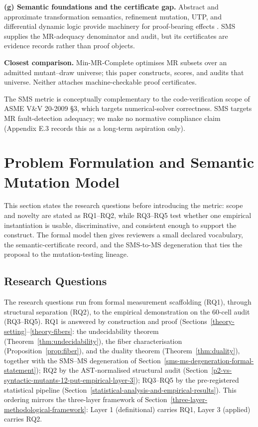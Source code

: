 \documentclass[review,12pt,authoryear]{elsarticle}
\begin{document}
\textbf{(g) Semantic foundations and the certificate gap.} Abstract and
approximate transformation semantics, refinement mutation, UTP, and
differential dynamic logic provide machinery for proof-bearing effects
\citep{46aba24d3e925f6d8d2efd5b5f6ee0d5ea7558cd,72269d5ab33ed790ece6856ba0309ed070d83622,11efca8804ed387c9cc3956868f0eb43597c8d10,6d492b783178b02dae163fbfe837857b982deed2,92d99528fe8e70345901cf56aa4d1037f0c3aa96,97a550b469c6151734d1220e37a7985d896191ee,7a867d014c3e10e45e4220c5dcf605e8df6ef38d}.
SMS supplies the MR-adequacy denominator and audit, but its certificates
are evidence records rather than proof objects.

\textbf{Closest comparison.} Min-MR-Complete
\citep{li2026minmrcomplete} optimises MR subsets over an admitted
mutant--draw universe; this paper constructs, scores, and audits that
universe. Neither attaches machine-checkable proof certificates.

The SMS metric is conceptually complementary to the code-verification
scope of ASME V\&V 20-2009 §3, which targets numerical-solver
correctness. SMS targets MR fault-detection adequacy; we make no
normative compliance claim (Appendix E.3 records this as a long-term
aspiration only).

\section{Problem Formulation and Semantic Mutation Model}\label{research-questions-and-hypotheses}

This section states the research questions before introducing the metric:
scope and novelty are stated as RQ1--RQ2, while RQ3--RQ5 test whether
one empirical instantiation is usable, discriminative, and consistent
enough to support the construct. The formal model then gives reviewers a
small declared vocabulary, the semantic-certificate record, and the
SMS-to-MS degeneration that ties the proposal to the mutation-testing
lineage.

\subsection{Research Questions}\label{research-questions}

The research questions run from formal measurement
scaffolding (RQ1), through structural separation (RQ2), to the
empirical demonstration on the 60-cell audit (RQ3--RQ5). RQ1 is answered
by construction and proof (Sections~\ref{theory-setting}--\ref{theory-fibers}: the undecidability theorem (Theorem~\ref{thm:undecidability}),
the fiber characterisation (Proposition~\ref{prop:fiber}), and the duality theorem (Theorem~\ref{thm:duality}), together
with the SMS--MS degeneration of Section~\ref{sms-ms-degeneration-formal-statement}); RQ2 by the
AST-normalised structural audit (Section~\ref{p2-vs-syntactic-mutants-12-put-empirical-layer-3}); RQ3--RQ5 by the pre-registered
statistical pipeline (Section~\ref{statistical-analysis-and-empirical-results}). This ordering mirrors the three-layer
framework of Section~\ref{three-layer-methodological-framework}: Layer 1 (definitional) carries RQ1, Layer 3 (applied)
carries RQ2.
\end{document}
